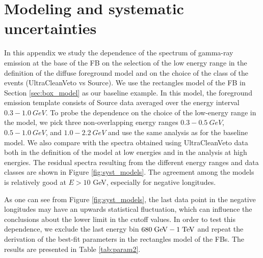 \section{Modeling and systematic uncertainties}

In this appendix we study the dependence of the spectrum of gamma-ray emission at the base of the FB
on the selection of the low energy range in the definition of the diffuse foreground model
and on the choice of the class of the events (UltraCleanVeto vs Source).
We use the rectangles model of the FB in Section \ref{sec:box_model}
as our baseline example.
In this model, the foreground emission template consists of Source data averaged over the energy interval $0.3 - \SI{1.0}{GeV}$. 
To probe the dependence on the choice of the low-energy range in the model, 
we pick three non-overlapping energy ranges $0.3 - \SI{0.5}{GeV}$, $0.5 - \SI{1.0}{GeV}$, and $1.0 - \SI{2.2}{GeV}$ 
and use the same analysis as for the baseline model. 
We also compare with the spectra obtained using UltraCleanVeto data both in the definition of the model
at low energies and in the analysis at high energies.
The residual spectra resulting from the different energy ranges and data classes are shown in Figure \ref{fig:syst_models}. 
The agreement among the models is relatively good at $E > 10$ GeV, especially for negative longitudes.

As one can see from Figure \ref{fig:syst_models}, the last data point in the negative longitudes may have an upwards statistical fluctuation,
which can influence the conclusions about the lower limit in the cutoff values.
In order to test this dependence, we exclude the last energy bin $680\;{\rm GeV} - 1\;{\rm TeV}$ and 
repeat the derivation of the best-fit parameters in the rectangles model of the FBs.
The results are presented in Table \ref{tab:param2}.


